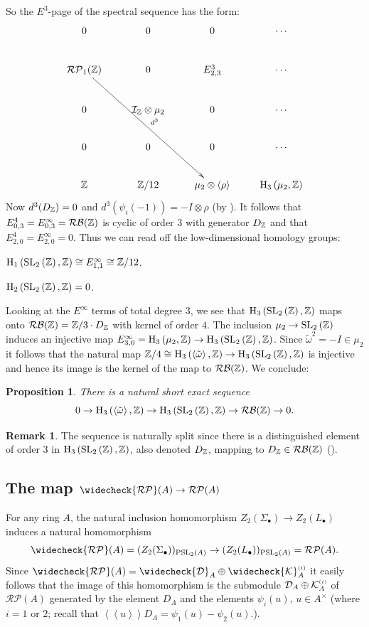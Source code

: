 \documentclass[12pt]{amsart}
\newtheorem{prop}[lem]{Proposition}
\theoremstyle{definition}
\newtheorem{rem}[lem]{Remark}
\newcommand{\Z}{\Bbb{Z}}
\newcommand{\K}{\mathcal{K}}
\newcommand{\spl}[2]{\operatorname{SL}_{#1}\left(#2\right)}
\newcommand{\pspl}[2]{\mathrm{PSL}_{#1}(#2)}
\newcommand{\rpb}[1]{\mathcal{RP}(#1)}%
\newcommand{\rpbker}[1]{\mathcal{RP}_1(#1)}%
\newcommand{\crpb}[1]{\widecheck{\mathcal{RP}}(#1)}
\newcommand{\bl}[1]{\mathcal{B}(#1)}%
\newcommand{\rbl}[1]{{\mathcal{RB}}(#1)}%
\newcommand{\suss}[2]{\psi_{#1}\left( #2\right)}
\newcommand{\ks}[2]{{\K}^{\mbox{\tiny $(#1)$}}_{#2}}
\newcommand{\cks}[2]{\widecheck{{\K}}^{\mbox{\tiny $(#1)$}}_{#2}}
\newcommand{\cconst}[1]{D_{#1}}
\newcommand{\cconstmod}[1]{\mathcal{D}_{#1}}
\newcommand{\ccconstmod}[1]{\widecheck{\mathcal{D}}_{#1}}
\newcommand{\<}{\langle}
\renewcommand{\>}{\rangle}
\newcommand{\an}[1]{\left\langle{#1}\right\rangle}
\newcommand{\pf}[1]{\left\langle\!\left\langle{#1}\right\rangle\!\right\rangle}
\newcommand{\aug}[1]{\mathcal{I}_{#1}}
\newcommand{\ho}[3]{\mathrm{H}_{#1}\left( #2,#3 \right)}
\begin{document}
So the $E^3$-page of the spectral sequence has the form:
\[
\xymatrix{
0&0&0&\cdots\\
\rpbker{\Z}\ar^-{d^3}[rrddd]&0&E^3_{2,3}&\cdots\\
0&\aug{\Z}\otimes{\mu_2}&0&\cdots\\
0&0&0&\cdots\\
\Z&\Z/12&\mu_2\otimes\an{\rho}&\ho{3}{\mu_2}{\Z}\\
}
\]
Now $d^3(\cconst{\Z})=0$ and $d^3(\suss{i}{-1})=-I\otimes \rho$ (by \cite[Lemma A.12]{hut:bloch1}). It follows that $E^4_{0,3}=E^\infty_{0,3}=\rbl{\Z}$ is cyclic of order $3$ 
with generator $\cconst{\Z}$ and that $E^4_{2,0}=E^\infty_{2,0}=0$. Thus we can read off the low-dimensional homology groups: 

$\ho{1}{\spl{2}{\Z}}{\Z}\cong E^\infty_{1,1}\cong \Z/12$.

$\ho{2}{\spl{2}{\Z}}{\Z}=0$. 

Looking at the $E^\infty$ terms of total degree $3$, we see that $\ho{3}{\spl{2}{\Z}}{\Z}$ maps onto $\rbl{\Z}=\Z/3\cdot\cconst{\Z}$ with kernel of order $4$.
The inclusion $\mu_2\to \spl{2}{\Z}$ induces an injective map $E^\infty_{3,0}=\ho{3}{\mu_2}{\Z}\to\ho{3}{\spl{2}{\Z}}{\Z}$. Since $\tilde{\omega}^2=-I\in\mu_2$ it follows that the natural map $\Z/4\cong\ho{3}{\an{\tilde{\omega}}}{\Z}\to\ho{3}{\spl{2}{\Z}}{\Z}$ is injective and hence its image is the kernel of the map to $\rbl{\Z}$. We conclude:
\begin{prop}\label{prop:h3sl2z} There is a natural short exact sequence 
\[
0\to\ho{3}{\an{\tilde{\omega}}}{\Z}\to \ho{3}{\spl{2}{\Z}}{\Z}\to\rbl{\Z}\to 0.
\]
\end{prop}
\begin{rem} The sequence is naturally split since there is a distinguished element of order $3$ in $\ho{3}{\spl{2}{\Z}}{\Z}$, also denoted $\cconst{\Z}$, mapping to $\cconst{\Z}\in\rbl{\Z}$
(\cite[Proposition 7.3]{hut:bloch1}).
\end{rem}
\subsection{The map $\crpb{A}\to \rpb{A}$}
For any ring $A$, the natural inclusion homomorphism $Z_2(\Sigma_\bullet)\to Z_2(L_\bullet)$ induces a natural homomorphism
 \[
\crpb{A}=(Z_2(\Sigma_\bullet))_{\pspl{2}{A}}\to 
(Z_2(L_\bullet))_{\pspl{2}{A}}=\rpb{A}.
\]
Since $\crpb{A}=\ccconstmod{A}\oplus \cks{i}{A}$ it easily follows that the image of this homomorphism is the submodule $\cconstmod{A}\oplus \ks{i}{A}$ of $\rpb{A}$ generated by the element $\cconst{A}$ and the elements $\suss{i}{u}$, $u\in A^\times$ (where $i=1$ or $2$; recall that $\pf{u}\cconst{A}=\suss{1}{u}-\suss{2}{u}$.).
\end{document}
